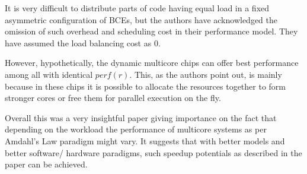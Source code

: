 \documentclass[a4paper,12 pt]{article}
\begin{document}
It is very difficult to distribute parts of code having equal load in a fixed asymmetric configuration of BCEs, but the authors have acknowledged the omission of such overhead and scheduling cost in their performance model. They have assumed the load balancing cost as 0.

However, hypothetically, the dynamic multicore chips can offer best performance among all with identical $perf(r)$. This, as the authors point out, is mainly because in these chips it is possible to allocate the resources together to form stronger cores or free them for parallel execution on the fly. 

Overall this was a very insightful paper giving importance on the fact that depending on the workload the performance of multicore systems as per Amdahl's Law paradigm might vary. It suggests that with better models and better software/ hardware paradigms, such speedup potentials as described in the paper can be achieved.
\end{document}
